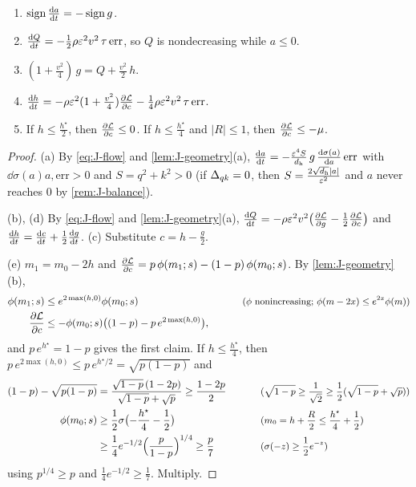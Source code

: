 \begin{lemma}
\label{lem:J-drift}
\begin{enumerate}[label=(\alph*),leftmargin=*,itemsep=2pt,topsep=3pt]
\item $\operatorname{sign}\ddt{a}=-\operatorname{sign}g$.
\item $\ddt{Q}=-\frac{1}{2}\rho\initscale^2v^2\,\tau\,\mathrm{err}$, so $Q$ is nondecreasing while $a\le0$.
\item $(1+\frac{v^2}{4})\,g=Q+\frac{v^2}{2}\,h$.
\item $\ddt{h}=-\rho\initscale^2(1+\frac{v^2}{4})\pd{\mathcal L}{c}-\frac{1}{4}\rho\initscale^2v^2\,\tau\,\mathrm{err}$.
\item If $h\le\frac{h^\star}{2}$, then $\pd{\mathcal L}{c}\le0$. If $h\le\frac{h^\star}{4}$ and $|R|\le1$, then $\pd{\mathcal L}{c}\le-\mu$.
\end{enumerate}
\end{lemma}

\begin{proof}
(a) By \cref{eq:J-flow} and \cref{lem:J-geometry}(a), $\ddt{a}=-\frac{\initscale^4S}{d_{\mathrm h}}\,g\,\dd{\sigma(a)}{a}\,\mathrm{err}$ with $\dd{\sigma(a)}{a},\mathrm{err}>0$ and $S=q^2+k^2>0$ (if $\Delta_{qk}=0$, then $S=\frac{2\sqrt{d_{\mathrm h}}|a|}{\varepsilon^2}$ and $a$ never reaches $0$ by \cref{rem:J-balance}).

(b), (d) By \cref{eq:J-flow} and \cref{lem:J-geometry}(a), $\ddt{Q}=-\rho\initscale^2v^2\bigl(\pd{\mathcal L}{g}-\frac{1}{2}\pd{\mathcal L}{c}\bigr)$ and
$\ddt{h}=\ddt{c}+\frac{1}{2}\ddt{g}$. (c) Substitute $c=h-\frac{g}{2}$.

(e) $m_1=m_0-2h$ and $\pd{\mathcal L}{c}=p\,\phi(m_1;s)-(1-p)\,\phi(m_0;s)$. By \cref{lem:J-geometry}(b),
\begin{alignat*}{2}
 \phi(m_1;s)&\le e^{2\max(h,0)}\phi(m_0;s) &\qquad& \why{$\phi$ nonincreasing; $\phi(m-2x)\le e^{2x}\phi(m)$}\\
 \pd{\mathcal L}{c}&\le-\phi(m_0;s)\bigl((1-p)-p\,e^{2\max(h,0)}\bigr),
\end{alignat*}
and $p\,e^{h^\star}=1-p$ gives the first claim. If $h\le\frac{h^\star}{4}$, then $p\,e^{2\max(h,0)}\le p\,e^{h^\star/2}=\sqrt{p(1-p)}$ and
\begin{alignat*}{2}
 (1-p)-\sqrt{p(1-p)}&=\frac{\sqrt{1-p}\,(1-2p)}{\sqrt{1-p}+\sqrt p}\ge\frac{1-2p}{2} &\qquad& \why{$\sqrt{1-p}\ge\tfrac{1}{\sqrt2}\ge\tfrac{1}{2}(\sqrt{1-p}+\sqrt p)$}\\
 \phi(m_0;s)&\ge\tfrac{1}{2}\sigma\bigl(-\tfrac{h^\star}{4}-\tfrac{1}{2}\bigr) && \why{$m_0=h+\tfrac{R}{2}\le\tfrac{h^\star}{4}+\tfrac{1}{2}$}\\
 &\ge\tfrac{1}{4}e^{-1/2}\Bigl(\frac{p}{1-p}\Bigr)^{1/4}\ge\frac{p}{7} && \why{$\sigma(-z)\ge\tfrac{1}{2}e^{-z}$}
\end{alignat*}
using $p^{1/4}\ge p$ and $\frac{1}{4}e^{-1/2}\ge\frac{1}{7}$. Multiply.
\end{proof}


